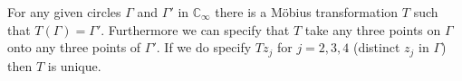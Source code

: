 For any given circles $\Gamma$ and $\Gamma'$ in $\mathbb{C}_\infty$ there is a Möbius transformation $T$ such that $T(\Gamma) = \Gamma'$. Furthermore we can specify that $T$ take any three points on $\Gamma$ onto any three points of $\Gamma'$. If we do specify $Tz_j$ for $j = 2, 3, 4$ (distinct $z_j$ in $\Gamma$) then $T$ is unique.